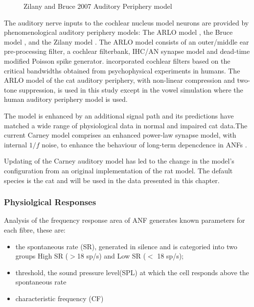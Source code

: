 \begin{figure}[tbh]
\begin{center}
\caption{Zilany and Bruce 2007 Auditory Periphery model}
\label{fig:ZilanyBruceFig}
\end{center}
\end{figure}


The auditory nerve inputs to the cochlear nucleus model neurons are
provided by phenomenological auditory periphery models: The ARLO model
\citet{HeinzZhangEtAl:2001}, the Bruce model
\citet{BruceSachsEtAl:2003,ZilanyBruce:2006,ZilanyBruce:2007}, and the
Zilany model \citep{ZilanyBruceEtAl:2009}. The ARLO model consists of
an outer/middle ear pre-processing filter, a cochlear filterbank,
IHC/AN synapse model and dead-time modified Poisson spike
generator. \citep{HeinzZhangEtAl:2001} incorporated cochlear filters
based on the critical bandwidths obtained from psycho\-physical
experiments in humans. The ARLO model of the cat auditory periphery,
with non-linear compression and two-tone suppression, is used in this
study except in the vowel simulation where the human auditory
periphery model is used.

\medskip{}

The \citet{ZilanyBruce:2007} model is enhanced by an additional signal
path and its predictions have matched a wide range of physiological
data in normal and impaired cat data.The current Carney model
comprises an enhanced power-law synapse model, with internal $1/f$
noise, to enhance the behaviour of long-term depencdence in ANFs
\citep{ZilanyBruceEtAl:2009}.

\medskip{}

Updating of the Carney auditory model has led to the change in the
model's configuration from an original implementation of the rat model. 
The default species is the cat and will be used in the data presented in this chapter.

\subsubsection{Physiolgical Responses}

Analysis of the frequency response area of ANF generates known parameters for each fibre, these are:
\begin{itemize}
  \item the spontaneous rate (SR), generated in silence and is
    categoried into two groups High SR ($>$18 sp/s) and Low SR ($<$ 18
    sp/s);
  \item threshold, the sound pressure level(SPL) at which the cell
    responds above the spontaneous rate
  \item characteristic frequency (CF)
\end{itemize}

